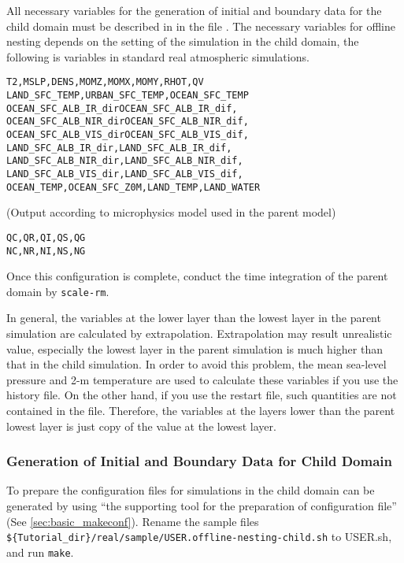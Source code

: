 All necessary variables for the generation of initial and boundary data for the child domain must be described in  in the file \runconf.
The necessary variables for offline nesting depends on the setting of the simulation in the child domain, the following is variables in standard real atmospheric simulations.
\begin{alltt}
  T2, MSLP, DENS, MOMZ, MOMX, MOMY, RHOT, QV
  LAND_SFC_TEMP, URBAN_SFC_TEMP, OCEAN_SFC_TEMP
  OCEAN_SFC_ALB_IR_dir OCEAN_SFC_ALB_IR_dif,
  OCEAN_SFC_ALB_NIR_dir OCEAN_SFC_ALB_NIR_dif,
  OCEAN_SFC_ALB_VIS_dir OCEAN_SFC_ALB_VIS_dif,
  LAND_SFC_ALB_IR_dir, LAND_SFC_ALB_IR_dif,
  LAND_SFC_ALB_NIR_dir, LAND_SFC_ALB_NIR_dif,
  LAND_SFC_ALB_VIS_dir, LAND_SFC_ALB_VIS_dif,
  OCEAN_TEMP, OCEAN_SFC_Z0M, LAND_TEMP, LAND_WATER
\end{alltt}
(Output according to microphysics model used in the parent model)
\begin{alltt}
  QC, QR, QI, QS, QG
  NC, NR, NI, NS, NG
\end{alltt}
Once this configuration is complete, conduct the time integration of the parent domain by \verb|scale-rm|.


In general, the variables at the lower layer than the lowest layer in the parent simulation are calculated by extrapolation.
Extrapolation may result unrealistic value, especially the lowest layer in the parent simulation is much higher than that in the child simulation.
In order to avoid this problem, the mean sea-level pressure and 2-m temperature are used to calculate these variables if you use the history file.
On the other hand, if you use the restart file, such quantities are not contained in the file.
Therefore, the variables at the layers lower than the parent lowest layer is just copy of the value at the lowest layer.

\subsubsection{Generation of Initial and Boundary Data for Child Domain}


To prepare the configuration files for simulations in the child domain can be generated by using ``the supporting tool for the preparation of configuration file'' (See \ref{sec:basic_makeconf}).
Rename the sample files \\ \verb|${Tutorial_dir}/real/sample/USER.offline-nesting-child.sh| to USER.sh, and run \verb|make|.

